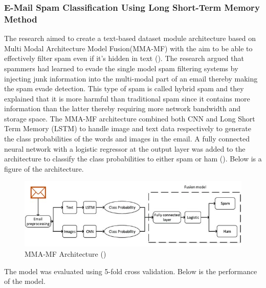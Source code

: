 \subsubsection{E-Mail Spam Classification Using Long Short-Term Memory Method}
The research aimed to create a text-based dataset module architecture based on Multi Modal Architecture Model Fusion(MMA-MF) with the aim to be able to effectively filter spam even if it's hidden in text (\cite{dongre_patidar_2019}). The research argued that spammers had learned to evade the single model spam filtering systems by injecting junk information into the multi-modal part of an email thereby making the spam evade detection. This type of spam is called hybrid spam and they explained that it is more harmful than traditional spam since it contains more information than the latter thereby requiring more network bandwidth and storage space. The MMA-MF architecture combined both CNN and Long Short Term Memory (LSTM) to handle image and text data respectively to generate the class probabilities of the words and images in the email. A fully connected neural network with a logistic regressor at the output layer was added to the architecture to classify the class probabilities to either spam or ham (\cite{dongre_patidar_2019}).
Below is a figure of the architecture.
\begin{figure}[H]
    \centering
    \includegraphics[width=13cm]{img/mma-mf.jpg}
    \caption{MMA-MF Architecture (\cite{dongre_patidar_2019})}
    \label{fig:hybrid_arch}
\end{figure}

The model was evaluated using 5-fold cross validation. Below is the performance of the model.

